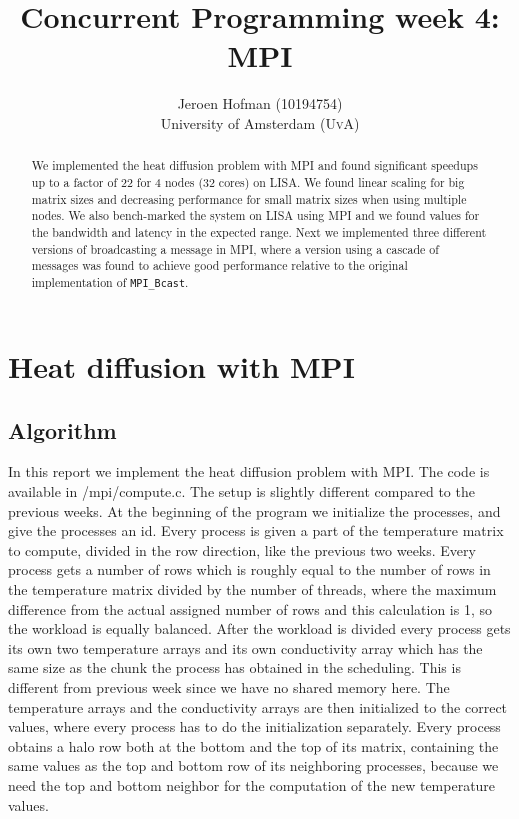 \documentclass[11pt,a4paper,onecolumn]{article}
\author{Jeroen Hofman (10194754) \\
[15pt] University of Amsterdam (\textsc{UvA})}
\title{Concurrent Programming week 4:\\
  MPI
		}
\begin{document}
\maketitle
\captionsetup{width=0.8\textwidth}
\thispagestyle{empty}

\begin{center}
\begin{abstract}
\small{We implemented the heat diffusion problem with MPI and found significant speedups up to a factor of 22 for 4 nodes (32 cores) on LISA. We found linear scaling for big matrix sizes and decreasing performance for small matrix sizes when using multiple nodes. We also bench-marked the system on LISA using MPI and we found values for the bandwidth and latency in the expected range. Next we implemented three different versions of broadcasting a message in MPI, where a version using a cascade of messages was found to achieve good performance relative to the original implementation of \texttt{MPI\_Bcast}.}
\end{abstract}
\end{center}

\newpage
\tableofcontents
\newpage

\section{Heat diffusion with MPI}
\subsection{Algorithm}
In this report we implement the heat diffusion problem with MPI. The code is available in /mpi/compute.c. The setup is slightly different compared to the previous weeks. At the beginning of the program we initialize the processes, and give the processes an id. Every process is given a part of the temperature matrix to compute, divided in the row direction, like the previous two weeks. Every process gets a number of rows which is roughly equal to the number of rows in the temperature matrix divided by the number of threads, where the maximum difference from the actual assigned number of rows and this calculation is 1, so the workload is equally balanced. After the workload is divided every process gets its own two temperature arrays and its own conductivity array which has the same size as the chunk the process has obtained in the scheduling. This is different from previous week since we have no shared memory here. The temperature arrays and the conductivity arrays are then initialized to the correct values, where every process has to do the initialization separately. Every process obtains a halo row both at the bottom and the top of its matrix, containing the same values as the top and bottom row of its neighboring processes, because we need the top and bottom neighbor for the computation of the new temperature values.
\end{document}
